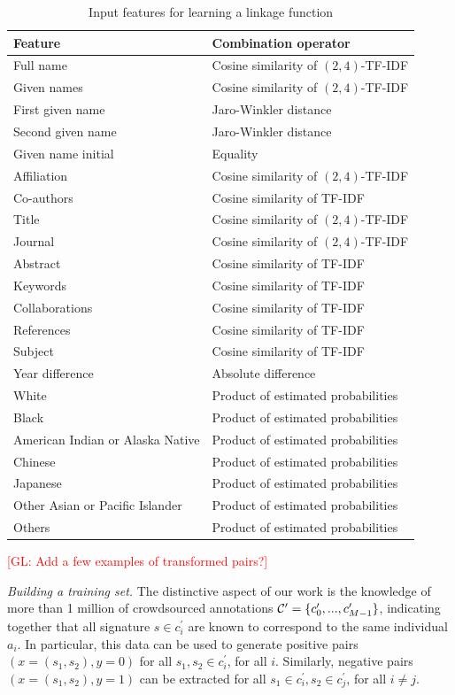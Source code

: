 \documentclass{article}
\newcommand{\glnote}[1]{\textcolor{red}{[GL: #1]}}
\begin{document}
\begin{table}
\caption{Input features for learning a linkage function}
\label{table:features}
\centering
\begin{tabular}{|l|l|}
  \hline
  \textbf{Feature} & \textbf{Combination operator}\\
  \hline
  \hline
  Full name & Cosine similarity of $(2,4)$-TF-IDF\\
  Given names & Cosine similarity of $(2,4)$-TF-IDF\\
  First given name & Jaro-Winkler distance\\
  Second given name & Jaro-Winkler distance\\
  Given name initial & Equality\\
  Affiliation & Cosine similarity of $(2,4)$-TF-IDF\\
  Co-authors & Cosine similarity of TF-IDF\\
  Title & Cosine similarity of $(2,4)$-TF-IDF\\
  Journal & Cosine similarity of $(2,4)$-TF-IDF\\
  Abstract & Cosine similarity of TF-IDF\\
  Keywords & Cosine similarity of TF-IDF\\
  Collaborations & Cosine similarity of TF-IDF\\
  References & Cosine similarity of TF-IDF\\
  Subject & Cosine similarity of TF-IDF\\
  Year difference & Absolute difference\\
  \hline
  White & Product of estimated probabilities\\
  Black & Product of estimated probabilities\\
  American Indian or Alaska Native & Product of estimated probabilities\\
  Chinese & Product of estimated probabilities\\
  Japanese & Product of estimated probabilities\\
  Other Asian or Pacific Islander & Product of estimated probabilities\\
  Others & Product of estimated probabilities\\
  \hline
\end{tabular}
\end{table}

\glnote{Add a few examples of transformed pairs?}

\textit{Building a training set.} The distinctive aspect of our work is the
knowledge of more than 1 million of crowdsourced annotations ${\cal C}^\prime = \{
c_0^\prime, ..., c_{M-1}^\prime \}$, indicating together that all signature $s \in
c_i^\prime$ are known to correspond to the same individual $a_i$. In particular,
this data can be used to generate positive pairs $(x=(s_1, s_2), y=0)$ for all
$s_1, s_2 \in c_i^\prime$, for all $i$. Similarly, negative pairs $(x=(s_1,
s_2), y=1)$ can be extracted for all $s_1 \in c_i^\prime, s_2 \in c_j^\prime$, for
all $i \neq j$.
\end{document}

